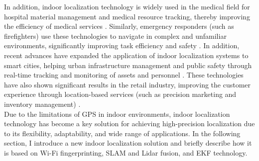 \documentclass[12pt,a4paper]{article}
\numberwithin{equation}{section}
\begin{document}
\noindent In addition, indoor localization technology is widely used in the medical field for hospital material management and medical resource tracking, thereby improving the efficiency of medical services \cite {HOSSAIN20151}. Similarly, emergency responders (such as firefighters) use these technologies to navigate in complex and unfamiliar environments, significantly improving task efficiency and safety \cite {fischer2010location}. In addition, recent advances have expanded the application of indoor localization systems to smart cities, helping urban infrastructure management and public safety through real-time tracking and monitoring of assets and personnel \cite{zhang2020smartcity}. These technologies have also shown significant results in the retail industry, improving the customer experience through location-based services (such as precision marketing and inventory management) \cite{chen2019indoor}.\\
Due to the limitations of GPS in indoor environments, indoor localization technology has become a key solution for achieving high-precision localization due to its flexibility, adaptability, and wide range of applications. In the following section, I introduce a new indoor localization solution and briefly describe how it is based on Wi-Fi fingerprinting, SLAM and Lidar fusion, and EKF technology.
\end{document}
